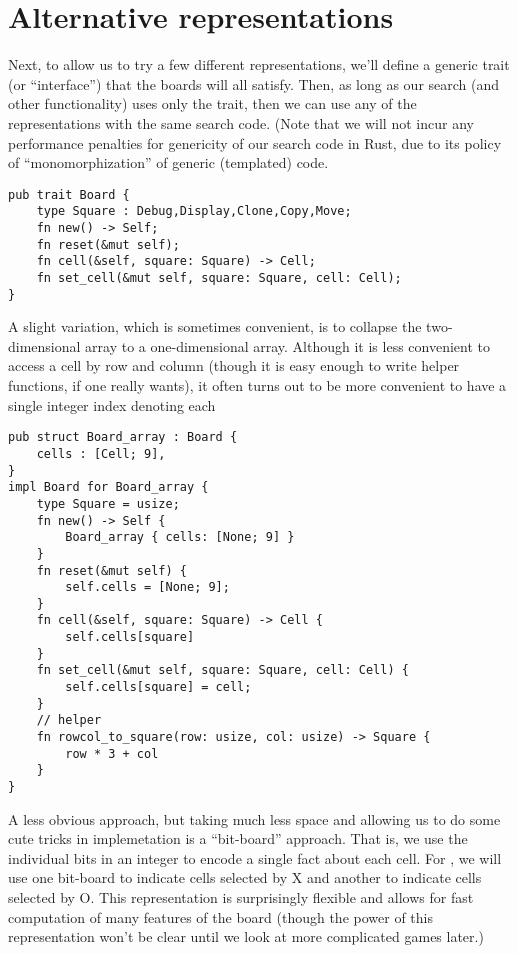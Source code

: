 \documentclass[10pt,dvipdfmx,letterpaper]{report}
\newcommand{\g}[1]{{\sc{#1}}\index{{\sc{#1}}}}
\begin{document}
\section{Alternative representations}

Next, to allow us to try a few different representations, we'll define a generic
trait (or ``interface'') that the boards will all satisfy.  Then, as long as our
search (and other functionality) uses only the trait, then we can use any of the
representations with the same search code.  (Note that we will not incur any
performance penalties for genericity of our search code in Rust, due to its policy
of ``monomorphization'' of generic (templated) code.

{\scriptsize
\begin{verbatim}
pub trait Board {
    type Square : Debug,Display,Clone,Copy,Move;
    fn new() -> Self;
    fn reset(&mut self);
    fn cell(&self, square: Square) -> Cell;
    fn set_cell(&mut self, square: Square, cell: Cell);
}
\end{verbatim}
}


A slight variation, which is sometimes convenient, is to collapse the two-dimensional array
to a one-dimensional array.  Although it is less convenient to access a cell by row and column
(though it is easy enough to write helper functions, if one really wants), it often turns out to
be more convenient to have a single integer index denoting each 
{\scriptsize
\begin{verbatim}
pub struct Board_array : Board {
    cells : [Cell; 9],
}
impl Board for Board_array {
    type Square = usize;
    fn new() -> Self {
        Board_array { cells: [None; 9] }
    }
    fn reset(&mut self) {
        self.cells = [None; 9];
    }
    fn cell(&self, square: Square) -> Cell {
        self.cells[square]
    }
    fn set_cell(&mut self, square: Square, cell: Cell) {
        self.cells[square] = cell;
    }
    // helper
    fn rowcol_to_square(row: usize, col: usize) -> Square {
        row * 3 + col
    }
}
\end{verbatim}
}

A less obvious approach, but taking much less space and allowing us to do some cute tricks
in implemetation is a ``bit-board'' approach.  That is, we use the individual bits in an integer
to encode a single fact about each cell.  For \g{tic-tac-toe}, we will use one bit-board to
indicate cells selected by X and another to indicate cells selected by O.
This representation is surprisingly flexible and allows for fast computation of many
features of the board (though the power of this representation won't be clear until
we look at more complicated games later.)
\end{document}
